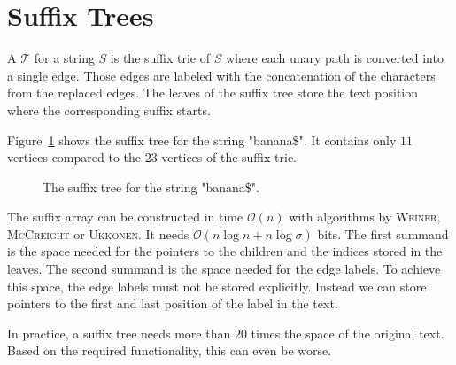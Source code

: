 \section{Suffix Trees}

\begin{Definition}
  A  $\mathcal{T}$ for a string $S$ is the suffix trie of $S$ where each unary path is converted into a single edge. Those edges are labeled with the concatenation of the characters from the replaced edges. The leaves of the suffix tree store the text position where the corresponding suffix starts.
\end{Definition}

\begin{Example}
  Figure~\ref{fig:suffixTreeExample} shows the suffix tree for the string "banana\$". It contains only $11$ vertices compared to the $23$ vertices of the suffix trie.
  \begin{figure}[htb]
    \centering
    
    \caption{The suffix tree for the string "banana\$".}
    \label{fig:suffixTreeExample}
  \end{figure}
\end{Example}

The suffix array can be constructed in time $\mathcal{O}(n)$ with algorithms by \textsc{Weiner}\cite{Weiner1973}, \textsc{McCreight}\cite{McCreight1976} or \textsc{Ukkonen}\cite{Ukkonen1995}. It needs $\mathcal{O}(n\log n + n\log \sigma)$ bits. The first summand is the space needed for the pointers to the children and the indices stored in the leaves. The second summand is the space needed for the edge labels. To achieve this space, the edge labels must not be stored explicitly. Instead we can store pointers to the first and last position of the label in the text.

In practice, a suffix tree needs more than $20$ times the space of the original text. Based on the required functionality, this can even be worse.

